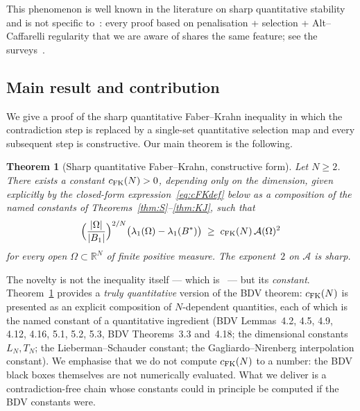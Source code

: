 \documentclass[11pt]{article}
\newtheorem{theorem}{Theorem}[section]
\theoremstyle{definition}
\newcommand{\R}{\mathbb{R}}
\newcommand{\Fr}{\mathcal{A}}
\newcommand{\Om}{\Omega}
\begin{document}
This phenomenon is well known in the literature on sharp quantitative
stability and is not specific to~\cite{BDV}: every proof based on
penalisation + selection + Alt--Caffarelli regularity that we are
aware of shares the same feature; see the
surveys~\cite{FuscoSurvey,Maggi2008}.

\subsection{Main result and contribution}\label{ssec:contribution}

We give a proof of the sharp quantitative Faber--Krahn inequality in
which the contradiction step is replaced by a single-set quantitative
selection map and every subsequent step is constructive. Our main
theorem is the following.

\begin{theorem}[Sharp quantitative Faber--Krahn, constructive form]
\label{thm:mainintro}
Let $N\ge2$. There exists a constant $c_{\rm FK}(N)>0$, depending
only on the dimension, given explicitly by the closed-form
expression~\eqref{eq:cFKdef} below as a composition of the named
constants of Theorems~\ref{thm:S}--\ref{thm:KJ}, such that
\[
   \Bigl(\frac{|\Om|}{|B_1|}\Bigr)^{2/N}
   \bigl(\lambda_1(\Om)-\lambda_1(B^*)\bigr)
   \;\ge\;c_{\rm FK}(N)\,\Fr(\Om)^2
\]
for every open $\Om\subset\R^{N}$ of finite positive measure. The exponent~$2$
on $\Fr$ is sharp.
\end{theorem}

The novelty is not the inequality itself --- which is~\cite{BDV} ---
but its \emph{constant}. Theorem~\ref{thm:mainintro} provides a
\emph{truly quantitative} version of the BDV theorem:
$c_{\rm FK}(N)$ is presented as an explicit composition of
$N$-dependent quantities, each of which is the named constant of a
quantitative ingredient (BDV Lemmas~4.2, 4.5, 4.9, 4.12, 4.16, 5.1,
5.2, 5.3, BDV Theorems~3.3 and~4.18; the dimensional constants
$L_N,T_N$; the Lieberman--Schauder constant; the
Gagliardo--Nirenberg interpolation constant). We emphasise that we do
not compute $c_{\rm FK}(N)$ to a number: the BDV black boxes
themselves are not numerically evaluated. What we deliver is a
contradiction-free chain whose constants could in principle be
computed if the BDV constants were.
\end{document}
